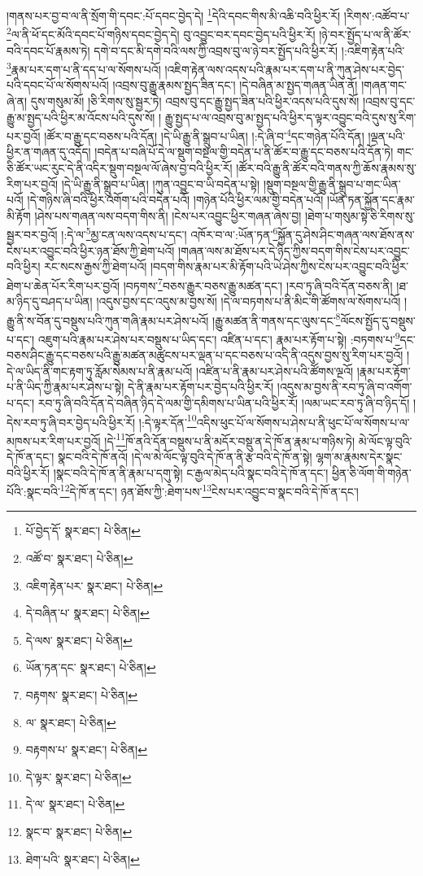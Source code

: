 །གནས་པར་བྱ་བ་ལ་ནི་སྲོག་གི་དབང་:པོ་དབང་བྱེད་དེ། \footnote{པོ་བྱེད་དོ་  སྣར་ཐང་།  པེ་ཅིན། }དེའི་དབང་གིས་མི་འཆི་བའི་ཕྱིར་རོ། །རིགས་:འཚོབ་པ་\footnote{འཚོ་བ་  སྣར་ཐང་།  པེ་ཅིན། }ལ་ནི་ཕོ་དང་མོའི་དབང་པོ་གཉིས་དབང་བྱེད་དེ། བུ་འབྱུང་བར་དབང་བྱེད་པའི་ཕྱིར་རོ། །ཉེ་བར་སྤྱོད་པ་ལ་ནི་ཚོར་བའི་དབང་པོ་རྣམས་ཏེ། དགེ་བ་དང་མི་དགེ་བའི་ལས་ཀྱི་འབྲས་བུ་ལ་ཉེ་བར་སྤྱོད་པའི་ཕྱིར་རོ། །:འཇིག་རྟེན་པའི་\footnote{འཇིག་རྟེན་པར་  སྣར་ཐང་།  པེ་ཅིན། }རྣམ་པར་དག་པ་ནི་དད་པ་ལ་སོགས་པའོ། །འཇིག་རྟེན་ལས་འདས་པའི་རྣམ་པར་དག་པ་ནི་ཀུན་ཤེས་པར་བྱེད་པའི་དབང་པོ་ལ་སོགས་པའོ། །འབྲས་བུ་རྒྱུ་རྣམས་སྤྱད་ཟིན་དང་། །དེ་བཞིན་མ་སྤྱད་གཞན་ཡིན་ནོ། །གཞན་གང་ཞེ་ན། དུས་གསུམ་མོ། །ཅི་རིགས་སུ་སྦྱར་ཏེ། འབྲས་བུ་དང་རྒྱུ་སྤྱད་ཟིན་པའི་ཕྱིར་འདས་པའི་དུས་སོ། །འབྲས་བུ་དང་རྒྱུ་མ་སྤྱད་པའི་ཕྱིར་མ་འོངས་པའི་དུས་སོ། །
རྒྱུ་སྤྱད་པ་ལ་འབྲས་བུ་མ་སྤྱད་པའི་ཕྱིར་ད་ལྟར་འབྱུང་བའི་དུས་སུ་རིག་པར་བྱའོ། །ཚོར་བ་རྒྱུ་དང་བཅས་པའི་དོན། །དེ་ཡི་རྒྱུ་ནི་སྒྲུབ་པ་ཡིན། །:དེ་ཞི་བ་\footnote{དེ་བཞིན་པ་  སྣར་ཐང་།  པེ་ཅིན། }དང་གཉེན་པོའི་དོན། །ལྡན་པའི་ཕྱིར་ན་གཞན་དུ་འདོད། །བདེན་པ་བཞི་པོ་དེ་ལ་སྡུག་བསྔལ་གྱི་བདེན་པ་ནི་ཚོར་བ་རྒྱུ་དང་བཅས་པའི་དོན་ཏེ། གང་ཅི་ཚོར་ཡང་རུང་དེ་ནི་འདིར་སྡུག་བསྔལ་ལོ་ཞེས་བྱ་བའི་ཕྱིར་རོ། །ཚོར་བའི་རྒྱུ་ནི་ཚོར་བའི་གནས་ཀྱི་ཆོས་རྣམས་སུ་རིག་པར་བྱའོ། །དེ་ཡི་རྒྱུ་ནི་སྒྲུབ་པ་ཡིན། །ཀུན་འབྱུང་བ་ཡི་བདེན་པ་སྟེ། །སྡུག་བསྔལ་གྱི་རྒྱུ་ནི་སྒྲུབ་པ་གང་ཡིན་པའོ། །དེ་གཉིས་ཞི་བའི་ཕྱིར་འགོག་པའི་བདེན་པའོ། །གཉེན་པོའི་ཕྱིར་ལམ་གྱི་བདེན་པའོ། །ཡོན་ཏན་སྐྱོན་དང་རྣམ་མི་རྟོག །ཤེས་པས་གཞན་ལས་བདག་གིས་ནི། །ངེས་པར་འབྱུང་ཕྱིར་གཞན་ཞེས་བྱ། །ཐེག་པ་གསུམ་སྟེ་ཅི་རིགས་སུ་སྦྱར་བར་བྱའོ། །:དེ་ལ་\footnote{དེ་ལས་  སྣར་ཐང་།  པེ་ཅིན། }མྱ་ངན་ལས་འདས་པ་དང་། འཁོར་བ་ལ་:ཡོན་ཏན་\footnote{ཡོན་ཏན་དང་  སྣར་ཐང་།  པེ་ཅིན། }སྐྱོན་དུ་ཤེས་ཤིང་གཞན་ལས་ཐོས་ནས་ངེས་པར་འབྱུང་བའི་ཕྱིར་ཉན་ཐོས་ཀྱི་ཐེག་པའོ། །གཞན་ལས་མ་ཐོས་པར་དེ་ཉིད་ཀྱིས་བདག་གིས་ངེས་པར་འབྱུང་བའི་ཕྱིར། རང་སངས་རྒྱས་ཀྱི་ཐེག་པའོ། །བདག་གིས་རྣམ་པར་མི་རྟོག་པའི་ཡེ་ཤེས་ཀྱིས་ངེས་པར་འབྱུང་བའི་ཕྱིར་ཐེག་པ་ཆེན་པོར་རིག་པར་བྱའོ། །བཏགས་\footnote{བརྟགས་  སྣར་ཐང་།  པེ་ཅིན། }བཅས་རྒྱུར་བཅས་རྒྱུ་མཚན་དང་། །རབ་ཏུ་ཞི་བའི་དོན་བཅས་ནི། །ཐ་མ་ཉིད་དུ་བཤད་པ་ཡིན། །འདུས་བྱས་དང་འདུས་མ་བྱས་སོ། །དེ་ལ་བཏགས་པ་ནི་མིང་གི་ཚོགས་ལ་སོགས་པའོ། །རྒྱུ་ནི་ས་བོན་དུ་བསྡུས་པའི་ཀུན་གཞི་རྣམ་པར་ཤེས་པའོ། །རྒྱུ་མཚན་ནི་གནས་དང་ལུས་དང་\footnote{ལ་  སྣར་ཐང་།  པེ་ཅིན། }ལོངས་སྤྱོད་དུ་བསྡུས་པ་དང་། འཇུག་པའི་རྣམ་པར་ཤེས་པར་བསྡུས་པ་ཡིད་དང་། འཛིན་པ་དང་། རྣམ་པར་རྟོག་པ་སྟེ། :བཏགས་པ་\footnote{བརྟགས་པ་  སྣར་ཐང་།  པེ་ཅིན། }དང་བཅས་ཤིང་རྒྱུ་དང་བཅས་པའི་རྒྱུ་མཚན་མཚུངས་པར་ལྡན་པ་དང་བཅས་པ་འདི་ནི་འདུས་བྱས་སུ་རིག་པར་བྱའོ། །དེ་ལ་ཡིད་ནི་གང་རྟག་ཏུ་རློམ་སེམས་པ་ནི་རྣམ་པའོ། །འཛིན་པ་ནི་རྣམ་པར་ཤེས་པའི་ཚོགས་ལྔའོ། །རྣམ་པར་རྟོག་པ་ནི་ཡིད་ཀྱི་རྣམ་པར་ཤེས་པ་སྟེ། དེ་ནི་རྣམ་པར་རྟོག་པར་བྱེད་པའི་ཕྱིར་རོ། །འདུས་མ་བྱས་ནི་རབ་ཏུ་ཞི་བ་འགོག་པ་དང་། རབ་ཏུ་ཞི་བའི་དོན་དེ་བཞིན་ཉིད་དེ་ལམ་གྱི་དམིགས་པ་ཡིན་པའི་ཕྱིར་རོ། །ལམ་ཡང་རབ་ཏུ་ཞི་བ་ཉིད་དོ། །དེས་རབ་ཏུ་ཞི་བར་བྱེད་པའི་ཕྱིར་རོ། །:དེ་ལྟར་དོན་\footnote{དེ་ལྟར་  སྣར་ཐང་།  པེ་ཅིན། }འདིས་ཕུང་པོ་ལ་སོགས་པ་ཤེས་པ་ནི་ཕུང་པོ་ལ་སོགས་པ་ལ་མཁས་པར་རིག་པར་བྱའོ། །དེ་\footnote{དེ་ལ་  སྣར་ཐང་།  པེ་ཅིན། }ཁོ་ནའི་དོན་བསྡུས་པ་ནི་མདོར་བསྡུ་ན་དེ་ཁོ་ན་རྣམ་པ་གཉིས་ཏེ། མེ་ལོང་ལྟ་བུའི་དེ་ཁོ་ན་དང་། སྣང་བའི་དེ་ཁོ་ནའོ། །དེ་ལ་མེ་ལོང་ལྟ་བུའི་དེ་ཁོ་ན་ནི་རྩ་བའི་དེ་ཁོ་ན་སྟེ། ལྷག་མ་རྣམས་དེར་སྣང་བའི་ཕྱིར་རོ། །སྣང་བའི་དེ་ཁོ་ན་ནི་རྣམ་པ་དགུ་སྟེ། ང་རྒྱལ་མེད་པའི་སྣང་བའི་དེ་ཁོ་ན་དང་། ཕྱིན་ཅི་ལོག་གི་གཉེན་པོའི་:སྣང་བའི་\footnote{སྣང་བ་  སྣར་ཐང་།  པེ་ཅིན། }དེ་ཁོ་ན་དང་། ཉན་ཐོས་ཀྱི་:ཐེག་པས་\footnote{ཐེག་པའི་  སྣར་ཐང་།  པེ་ཅིན། }ངེས་པར་འབྱུང་བ་སྣང་བའི་དེ་ཁོ་ན་དང་། 